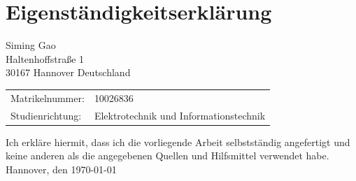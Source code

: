 \chapter*{Eigenständigkeitserklärung}
\thispagestyle{empty}
\vspace{1cm}

\begin{flushleft}

Siming Gao \\ 
Haltenhoffstraße 1 \\ 
30167 Hannover Deutschland

\vspace{1.0cm}

\begin{tabular}{@{} l l}
Matrikelnummer:  & 10026836 \\
Studienrichtung: & Elektrotechnik und Informationstechnik \\
\end{tabular}

\vspace{3.0cm}

Ich erkläre hiermit, dass ich die vorliegende Arbeit selbstständig
angefertigt und keine anderen als die angegebenen Quellen und
Hilfsmittel verwendet habe. \\ [2cm]

Hannover, den \today

\end{flushleft}


